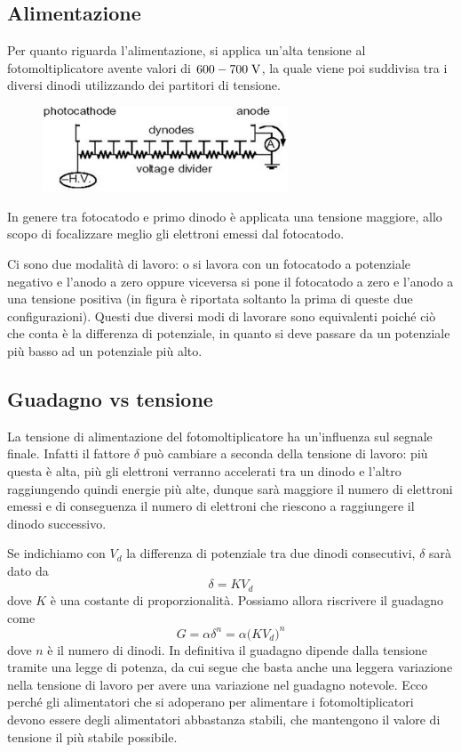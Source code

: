 \subsection{Alimentazione}
Per quanto riguarda l'alimentazione, si applica un'alta tensione al fotomoltiplicatore avente valori di $600-700 \rm \; V$, la quale viene poi suddivisa tra i diversi dinodi utilizzando dei partitori di tensione.
\begin{figure}[H]
   \centering
   \includegraphics[width=0.65\textwidth]{immagini/partitore_tensione.png}
\end{figure}
In genere tra fotocatodo e primo dinodo è applicata una tensione maggiore, allo scopo di focalizzare meglio gli elettroni emessi dal fotocatodo.

Ci sono due modalità di lavoro: o si lavora con un fotocatodo a potenziale negativo e l'anodo a zero oppure viceversa si pone il fotocatodo a zero e l'anodo a una tensione positiva (in figura è riportata soltanto la prima di queste due configurazioni). Questi due diversi modi di lavorare sono equivalenti poiché ciò che conta è la differenza di potenziale, in quanto si deve passare da un potenziale più basso ad un potenziale più alto.
\subsection{Guadagno vs tensione}
La tensione di alimentazione del fotomoltiplicatore ha un'influenza sul segnale finale. Infatti il fattore $\delta$ può cambiare a seconda della tensione di lavoro: più questa è alta, più gli elettroni verranno accelerati tra un dinodo e l'altro raggiungendo quindi energie più alte, dunque sarà maggiore il numero di elettroni emessi e di conseguenza il numero di elettroni che riescono a raggiungere il dinodo successivo.

Se indichiamo con $V_d$ la differenza di potenziale tra due dinodi consecutivi, $\delta$ sarà dato da
\begin{equation*}
   \delta=K V_d
\end{equation*}
dove $K$ è una costante di proporzionalità. Possiamo allora riscrivere il guadagno come
\begin{equation*}
   G=\alpha \delta^n
   =\alpha \bigl( KV_d \bigr)^n
\end{equation*}
dove $n$ è il numero di dinodi. In definitiva il guadagno dipende dalla tensione tramite una legge di potenza, da cui segue che basta anche una leggera variazione nella tensione di lavoro per avere una variazione nel guadagno notevole. Ecco perché gli alimentatori che si adoperano per alimentare i fotomoltiplicatori devono essere degli alimentatori abbastanza stabili, che mantengono il valore di tensione il più stabile possibile.

